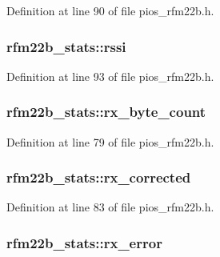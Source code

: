 Definition at line 90 of file pios\-\_\-rfm22b.\-h.

\hypertarget{structrfm22b__stats_af292c65ed2be928fd2c5e4639c2cf025}{
\subsubsection[{rssi}]{ rfm22b\-\_\-stats\-::rssi}}\label{structrfm22b__stats_af292c65ed2be928fd2c5e4639c2cf025}


Definition at line 93 of file pios\-\_\-rfm22b.\-h.

\hypertarget{structrfm22b__stats_a4a173cf22afe7f957dc268d65ab1833c}{
\subsubsection[{rx\-\_\-byte\-\_\-count}]{ rfm22b\-\_\-stats\-::rx\-\_\-byte\-\_\-count}}\label{structrfm22b__stats_a4a173cf22afe7f957dc268d65ab1833c}


Definition at line 79 of file pios\-\_\-rfm22b.\-h.

\hypertarget{structrfm22b__stats_aff132143dc1206acab2aa0972429aaba}{
\subsubsection[{rx\-\_\-corrected}]{ rfm22b\-\_\-stats\-::rx\-\_\-corrected}}\label{structrfm22b__stats_aff132143dc1206acab2aa0972429aaba}


Definition at line 83 of file pios\-\_\-rfm22b.\-h.

\hypertarget{structrfm22b__stats_aa732f9f0055fff25329e07f6b4cce221}{
\subsubsection[{rx\-\_\-error}]{ rfm22b\-\_\-stats\-::rx\-\_\-error}}\label{structrfm22b__stats_aa732f9f0055fff25329e07f6b4cce221}


